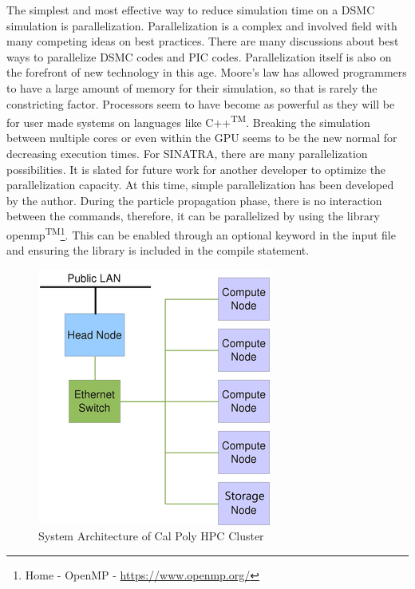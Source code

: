 \indent The simplest and most effective way to reduce simulation time on a DSMC simulation is parallelization. Parallelization is a complex and involved field with many competing ideas on best practices. There are many discussions about best ways to parallelize DSMC codes and PIC codes. Parallelization itself is also on the forefront of new technology in this age. Moore’s law has allowed programmers to have a large amount of memory for their simulation, so that is rarely the constricting factor. Processors seem to have become as powerful as they will be for user made systems on languages like C++\textsuperscript{TM}. Breaking the simulation between multiple cores or even within the GPU seems to be the new normal for decreasing execution times. For SINATRA, there are many parallelization possibilities. It is slated for future work for another developer to optimize the parallelization capacity. At this time, simple parallelization has been developed by the author. During the particle propagation phase, there is no interaction between the commands, therefore, it can be parallelized by using the library openmp\textsuperscript{TM}\footnote{Home - OpenMP - \url{https://www.openmp.org/}}. This can be enabled through an optional keyword in the input file and ensuring the library is included in the compile statement. \par

\begin{figure}
\includegraphics[width=.65\textwidth]{figures/HPC_cluster.png}
\centering
\caption{System Architecture of Cal Poly HPC Cluster\cite{hpc}}
\label{fig:hpccluser}
\end{figure}

